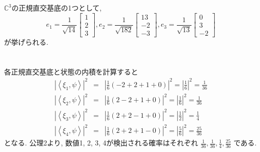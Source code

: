 \documentclass[a4paper,11pt]{jsarticle}
\begin{document}
\section{}
$\mathbb{C}^3$の正規直交基底の1つとして, 
\[
  e_1 = \frac{1}{\sqrt{14}}\begin{bmatrix}
    1 \\ 2 \\ 3
  \end{bmatrix}, 
  e_2 = \frac{1}{\sqrt{182}}\begin{bmatrix}
    13 \\ -2 \\ -3
  \end{bmatrix},
  e_3 = \frac{1}{\sqrt{13}}\begin{bmatrix}
    0 \\ 3 \\ -2
  \end{bmatrix}
\]
が挙げられる.

\section{}
各正規直交基底と状態の内積を計算すると
\begin{eqnarray*}
  |\left<\xi_1, \psi\right>|^2
  &=& \left|\frac{1}{6}(-2 + 2 + 1 + 0)\right|^2
  = \left|\frac{1}{6}\right|^2 = \frac{1}{36} \\
  |\left<\xi_2, \psi\right>|^2
  &=& \left|\frac{1}{6}(2 - 2 + 1 + 0)\right|^2
  = \left|\frac{1}{6}\right|^2 = \frac{1}{36} \\
  |\left<\xi_3, \psi\right>|^2
  &=& \left|\frac{1}{6}(2 + 2 - 1 + 0)\right|^2
  = \left|\frac{1}{2}\right|^2 = \frac{1}{4} \\
  |\left<\xi_4, \psi\right>|^2
  &=& \left|\frac{1}{6}(2 + 2 + 1 - 0)\right|^2
  = \left|\frac{5}{6}\right|^2 = \frac{25}{36}
\end{eqnarray*}
となる. 公理2より, 数値1, 2, 3, 4が検出される確率はそれぞれ
$\frac{1}{36}, \frac{1}{36}, \frac{1}{4}, \frac{25}{36}$
である.
\end{document}
